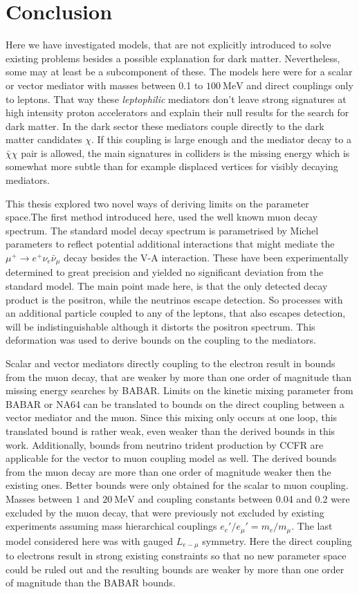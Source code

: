 \chapter{Conclusion}
\label{ch:conclusion}

Here we have investigated models, that are not explicitly introduced to solve existing problems besides a possible explanation for dark matter. Nevertheless, some may at least be a subcomponent of these. The models here were for a scalar or vector mediator with masses between 0.1 to $\SI{100}{\mega \eV}$ and direct couplings only to leptons. That way these \emph{leptophilic} mediators don't leave strong signatures at high intensity proton accelerators and explain their null results for the search for dark matter. In the dark sector these mediators couple directly to the dark matter candidates $\chi$. If this coupling is large enough and the mediator decay to a $\bar{\chi}\chi$ pair is allowed, the main signatures in colliders is the missing energy which is somewhat more subtle than for example displaced vertices for visibly decaying mediators.

This thesis explored two novel ways of deriving limits on the parameter space.The first method introduced here, used the well known muon decay spectrum. The standard model decay spectrum is parametrised by Michel parameters to reflect potential additional interactions that might mediate the $\mu^+\rightarrow e^+ \nu_e \bar{\nu}_\mu$ decay besides the V-A interaction. These have been experimentally determined to great precision and yielded no significant deviation from the standard model. The main point made here, is that the only detected decay product is the positron, while the neutrinos escape detection. So processes with an additional particle coupled to any of the leptons, that also escapes detection, will be indistinguishable although it distorts the positron spectrum. This deformation was used to derive bounds on the coupling to the mediators. 

Scalar and vector mediators directly coupling to the electron result in bounds from the muon decay, that are weaker by more than one order of magnitude than missing energy searches by BABAR. Limits on the kinetic mixing parameter from BABAR or NA64 can be translated to bounds on the direct coupling between a vector mediator and the muon. Since this mixing only occurs at one loop, this translated bound is rather weak, even weaker than the derived bounds in this work. Additionally, bounds from neutrino trident production by CCFR are applicable for the vector to muon coupling model as well. The derived bounds from the muon decay are more than one order of magnitude weaker then the existing ones. Better bounds were only obtained for the scalar to muon coupling. Masses between $1$ and $\SI{20}{\mega \eV}$ and coupling constants between 0.04 and 0.2 were excluded by the muon decay, that were previously not excluded by existing experiments assuming mass hierarchical couplings $e_e'/e_\mu'=m_e/m_\mu$. The last model considered here was with gauged $L_{e-\mu}$ symmetry. Here the direct coupling to electrons result in strong existing constraints so that no new parameter space could be ruled out and the resulting bounds are weaker by more than one order of magnitude than the BABAR bounds.

